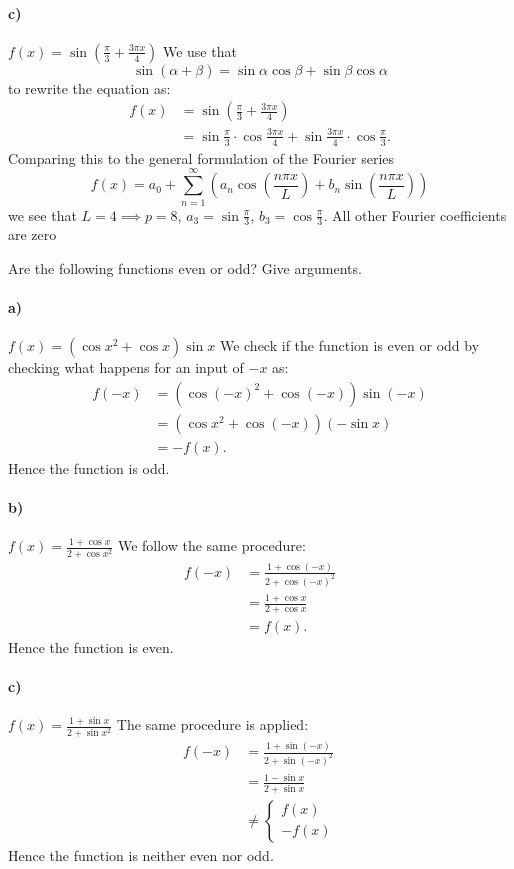 \paragraph{c)} $f(x) = \sin \left( \frac{\pi}{3} + \frac{3 \pi x}{4} \right)$
\bigbreak
We use that
\[ 
\sin (\alpha + \beta) = \sin \alpha \cos \beta + \sin \beta \cos \alpha
\]
to rewrite the equation as:
\begin{align*}
  f(x) &= \sin \left( \frac{\pi}{3} + \frac{3\pi x}{4}\right) \\
  &= \sin \frac{\pi}{3} \cdot \cos \frac{3\pi x}{4} + \sin \frac{3\pi x}{4} \cdot \cos \frac{\pi}{3}
.\end{align*}
Comparing this to the general formulation of the Fourier series
\[ 
f(x) = a_0 + \sum_{n = 1}^{\infty} \left( a_n \cos \left( \frac{n \pi x}{L} \right) + b_n \sin \left( \frac{n \pi x}{L} \right) \right)
\]
we see that $L = 4 \implies p = 8$, $a_3 = \sin \frac{\pi}{3}$, $b_3 = \cos \frac{\pi}{3}$. All other Fourier coefficients are zero

 Are the following functions even or odd? Give arguments.

\paragraph{a)} $f(x) = \left( \cos x^2 + \cos x \right) \sin x$
\bigbreak
We check if the function is even or odd by checking what happens for an input of $-x$ as:
\begin{align*}
  f(-x) &= \left( \cos (-x)^2 + \cos (-x) \right) \sin (-x) \\
  &= \left( \cos x^2 + \cos (-x) \right) (- \sin x) \\
  &= - f(x)
.\end{align*}
Hence the function is odd.

\paragraph{b)} $f(x) = \frac{1 + \cos x}{2 + \cos x^2}$
\bigbreak
We follow the same procedure:
\begin{align*}
  f(-x) &= \frac{1 + \cos (-x)}{2 + \cos (-x)^2} \\
  &= \frac{1 + \cos x}{2 + \cos x} \\
  &= f(x)
.\end{align*}
Hence the function is even.

\paragraph{c)} $f(x) = \frac{1 + \sin x}{2 + \sin x^2}$
\bigbreak
The same procedure is applied:
\begin{align*}
  f(-x) &= \frac{1 + \sin (-x)}{2 + \sin (-x)^2} \\
  &= \frac{1 -\sin x}{2 + \sin x} \\
  &\neq \begin{cases}
  f(x)\\
  -f(x)
  \end{cases}
\end{align*}
Hence the function is neither even nor odd.

